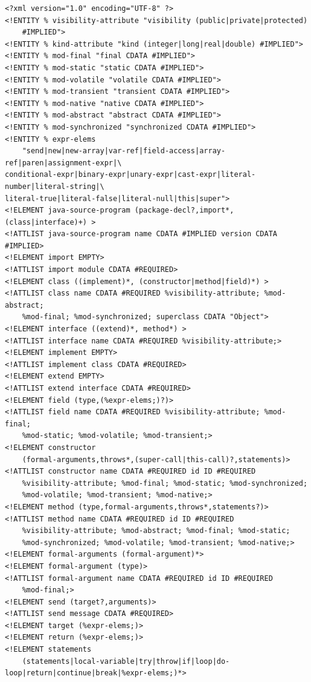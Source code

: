 \documentclass{article}
\begin{document}
\begin{verbatim}
<?xml version="1.0" encoding="UTF-8" ?>
<!ENTITY % visibility-attribute "visibility (public|private|protected)
    #IMPLIED">
<!ENTITY % kind-attribute "kind (integer|long|real|double) #IMPLIED">
<!ENTITY % mod-final "final CDATA #IMPLIED">
<!ENTITY % mod-static "static CDATA #IMPLIED">
<!ENTITY % mod-volatile "volatile CDATA #IMPLIED">
<!ENTITY % mod-transient "transient CDATA #IMPLIED">
<!ENTITY % mod-native "native CDATA #IMPLIED">
<!ENTITY % mod-abstract "abstract CDATA #IMPLIED">
<!ENTITY % mod-synchronized "synchronized CDATA #IMPLIED">
<!ENTITY % expr-elems
    "send|new|new-array|var-ref|field-access|array-ref|paren|assignment-expr|\
conditional-expr|binary-expr|unary-expr|cast-expr|literal-number|literal-string|\
literal-true|literal-false|literal-null|this|super">
<!ELEMENT java-source-program (package-decl?,import*,(class|interface)+) >
<!ATTLIST java-source-program name CDATA #IMPLIED version CDATA #IMPLIED>
<!ELEMENT import EMPTY>
<!ATTLIST import module CDATA #REQUIRED>
<!ELEMENT class ((implement)*, (constructor|method|field)*) >
<!ATTLIST class name CDATA #REQUIRED %visibility-attribute; %mod-abstract;
    %mod-final; %mod-synchronized; superclass CDATA "Object">
<!ELEMENT interface ((extend)*, method*) >
<!ATTLIST interface name CDATA #REQUIRED %visibility-attribute;>
<!ELEMENT implement EMPTY>
<!ATTLIST implement class CDATA #REQUIRED>
<!ELEMENT extend EMPTY>
<!ATTLIST extend interface CDATA #REQUIRED>
<!ELEMENT field (type,(%expr-elems;)?)>
<!ATTLIST field name CDATA #REQUIRED %visibility-attribute; %mod-final;
    %mod-static; %mod-volatile; %mod-transient;>
<!ELEMENT constructor
    (formal-arguments,throws*,(super-call|this-call)?,statements)>
<!ATTLIST constructor name CDATA #REQUIRED id ID #REQUIRED
    %visibility-attribute; %mod-final; %mod-static; %mod-synchronized;
    %mod-volatile; %mod-transient; %mod-native;>
<!ELEMENT method (type,formal-arguments,throws*,statements?)>
<!ATTLIST method name CDATA #REQUIRED id ID #REQUIRED
    %visibility-attribute; %mod-abstract; %mod-final; %mod-static;
    %mod-synchronized; %mod-volatile; %mod-transient; %mod-native;>
<!ELEMENT formal-arguments (formal-argument)*>
<!ELEMENT formal-argument (type)>
<!ATTLIST formal-argument name CDATA #REQUIRED id ID #REQUIRED
    %mod-final;>
<!ELEMENT send (target?,arguments)>
<!ATTLIST send message CDATA #REQUIRED>
<!ELEMENT target (%expr-elems;)>
<!ELEMENT return (%expr-elems;)>
<!ELEMENT statements
    (statements|local-variable|try|throw|if|loop|do-loop|return|continue|break|%expr-elems;)*>

\end{verbatim}
\end{document}
